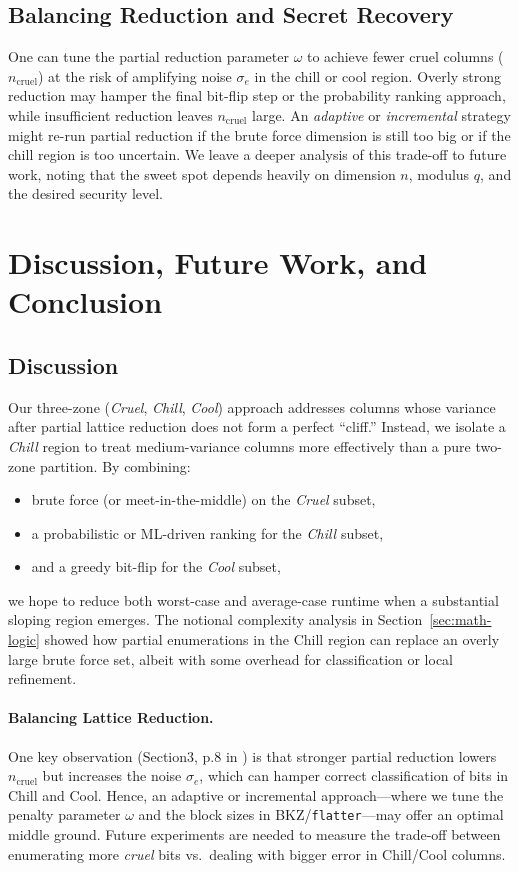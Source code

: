\documentclass[11pt]{article}
\begin{document}
\subsection{Balancing Reduction and Secret Recovery}
\label{subsec:balance}

One can tune the partial reduction parameter $\omega$ to achieve fewer cruel columns ($n_{\mathrm{cruel}}$) at the risk of amplifying noise $\sigma_e$ in the chill or cool region. Overly strong reduction may hamper the final bit-flip step or the probability ranking approach, while insufficient reduction leaves $n_{\mathrm{cruel}}$ large. An \emph{adaptive} or \emph{incremental} strategy might re-run partial reduction if the brute force dimension is still too big or if the chill region is too uncertain. We leave a deeper analysis of this trade-off to future work, noting that the sweet spot depends heavily on dimension $n$, modulus $q$, and the desired security level.

\section{Discussion, Future Work, and Conclusion}
\label{sec:discussion-future-conclusion}

\subsection{Discussion}
Our three-zone (\emph{Cruel}, \emph{Chill}, \emph{Cool}) approach addresses columns whose variance after partial lattice reduction does not form a perfect “cliff.” Instead, we isolate a \emph{Chill} region to treat medium-variance columns more effectively than a pure two-zone partition. By combining:
\begin{itemize}
    \item brute force (or meet-in-the-middle) on the \emph{Cruel} subset,
    \item a probabilistic or ML-driven ranking for the \emph{Chill} subset, 
    \item and a greedy bit-flip for the \emph{Cool} subset,
\end{itemize}
we hope to reduce both worst-case and average-case runtime when a substantial sloping region emerges. The notional complexity analysis in Section~\ref{sec:math-logic} showed how partial enumerations in the Chill region can replace an overly large brute force set, albeit with some overhead for classification or local refinement.

\paragraph{Balancing Lattice Reduction.}
One key observation (Section3, p.8 in \cite{cool-and-cruel}) is that stronger partial reduction lowers $n_{\mathrm{cruel}}$ but increases the noise $\sigma_e$, which can hamper correct classification of bits in Chill and Cool. Hence, an adaptive or incremental approach—where we tune the penalty parameter $\omega$ and the block sizes in BKZ/\texttt{flatter}—may offer an optimal middle ground. Future experiments are needed to measure the trade-off between enumerating more \emph{cruel} bits vs.\ dealing with bigger error in Chill/Cool columns.
\end{document}
